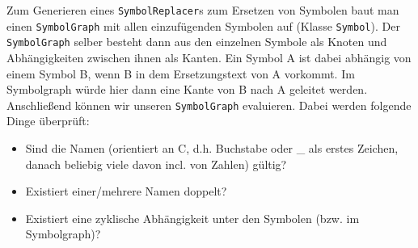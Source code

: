 Zum Generieren eines \texttt{SymbolReplacer}s zum Ersetzen von Symbolen baut man einen \texttt{SymbolGraph} mit allen einzufügenden Symbolen auf (Klasse \texttt{Symbol}). Der \texttt{SymbolGraph} selber besteht dann aus den einzelnen Symbole als Knoten und Abhängigkeiten zwischen ihnen als Kanten. Ein Symbol A ist dabei abhängig von einem Symbol B, wenn B in dem Ersetzungstext von A vorkommt. Im Symbolgraph würde hier dann eine Kante von B nach A geleitet werden. Anschließend können wir unseren \texttt{SymbolGraph} evaluieren. Dabei werden folgende Dinge überprüft:
\begin {itemize}
\item Sind die Namen (orientiert an C, d.h. Buchstabe oder _ als erstes Zeichen, danach beliebig viele davon incl. von Zahlen) gültig?
\item Existiert einer/mehrere Namen doppelt?
\item Existiert eine zyklische Abhängigkeit unter den Symbolen (bzw. im Symbolgraph)?
\end {itemize}

